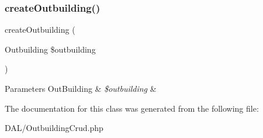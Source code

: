 \subsubsection{\texorpdfstring{createOutbuilding()}{createOutbuilding()}}
{\footnotesize\ttfamily create\+Outbuilding (\begin{DoxyParamCaption}\item[{Outbuilding}]{\$outbuilding }\end{DoxyParamCaption})}


\begin{DoxyParams}[1]{Parameters}
Out\+Building & {\em \$outbuilding} & \\
\hline
\end{DoxyParams}


The documentation for this class was generated from the following file\+:\begin{DoxyCompactItemize}
\item 
D\+A\+L/Outbuilding\+Crud.\+php\end{DoxyCompactItemize}
